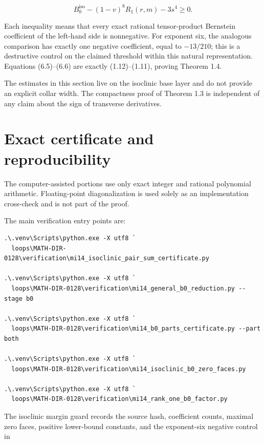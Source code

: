 \documentclass[11pt]{article}
\begin{document}
\begin{equation}
B_0^{\mathrm{iso}}-(1-v)^8R_1(r,m)-3s^4\ge0.
\tag{6.6}
\end{equation}

Each inequality means that every exact rational tensor-product Bernstein coefficient of the left-hand side is nonnegative. For exponent six, the analogous comparison has exactly one negative coefficient, equal to $-13/210$; this is a destructive control on the claimed threshold within this natural representation. Equations (6.5)--(6.6) are exactly (1.12)--(1.11), proving Theorem 1.4.

The estimates in this section live on the isoclinic base layer and do not provide an explicit collar width. The compactness proof of Theorem 1.3 is independent of any claim about the sign of transverse derivatives.

\section{Exact certificate and reproducibility}

The computer-assisted portions use only exact integer and rational polynomial arithmetic. Floating-point diagonalization is used solely as an implementation cross-check and is not part of the proof.

The main verification entry points are:

\begin{samepage}
\begin{Verbatim}[fontsize=\small]
.\.venv\Scripts\python.exe -X utf8 `
  loops\MATH-DIR-0128\verification\mi14_isoclinic_pair_sum_certificate.py

.\.venv\Scripts\python.exe -X utf8 `
  loops\MATH-DIR-0128\verification\mi14_general_b0_reduction.py --stage b0

.\.venv\Scripts\python.exe -X utf8 `
  loops\MATH-DIR-0128\verification\mi14_b0_parts_certificate.py --part both

.\.venv\Scripts\python.exe -X utf8 `
  loops\MATH-DIR-0128\verification\mi14_isoclinic_b0_zero_faces.py

.\.venv\Scripts\python.exe -X utf8 `
  loops\MATH-DIR-0128\verification\mi14_rank_one_b0_factor.py
\end{Verbatim}
\end{samepage}

The isoclinic margin guard records the source hash, coefficient counts, maximal zero faces, positive lower-bound constants, and the exponent-six negative control in
\end{document}
